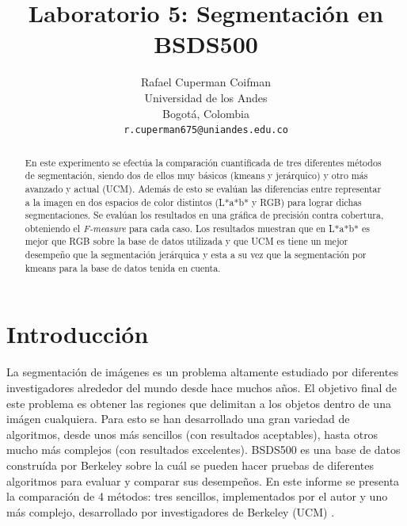 \documentclass[10pt,twocolumn,letterpaper]{article}
\begin{document}
\title{Laboratorio 5: Segmentación en BSDS500}

\author{Rafael Cuperman Coifman\\
Universidad de los Andes\\
Bogotá, Colombia\\
{\tt\small r.cuperman675@uniandes.edu.co}
}

\maketitle

\begin{abstract}
 En este experimento se efectúa la comparación cuantificada de tres diferentes métodos de segmentación, siendo dos de ellos muy básicos (kmeans y jerárquico) y otro más avanzado y actual (UCM). Además de esto se evalúan las diferencias entre representar a la imagen en dos espacios de color distintos (L*a*b* y RGB) para lograr dichas segmentaciones. Se evalúan los resultados en una gráfica de precisión contra cobertura, obteniendo el \textit{F-measure} para cada caso. Los resultados muestran que en L*a*b* es mejor que RGB sobre la base de datos utilizada y que UCM es tiene un mejor desempeño que la segmentación jerárquica y esta a su vez que la segmentación por kmeans para la base de datos tenida en cuenta. 
\end{abstract}

\section{Introducción}

La segmentación de imágenes es un problema altamente estudiado por diferentes investigadores alrededor del mundo desde hace muchos años. El objetivo final de este problema es obtener las regiones que delimitan a los objetos dentro de una imágen cualquiera. Para esto se han desarrollado una gran variedad de algoritmos, desde unos más sencillos (con resultados aceptables), hasta otros mucho más complejos (con resultados excelentes). BSDS500 es una base de datos construída por Berkeley sobre la cuál se pueden hacer pruebas de diferentes algoritmos para evaluar y comparar sus desempeños. En este informe se presenta la comparación de 4 métodos: tres sencillos, implementados por el autor y uno más complejo, desarrollado por investigadores de Berkeley (UCM) \cite{UCM}.
\end{document}
